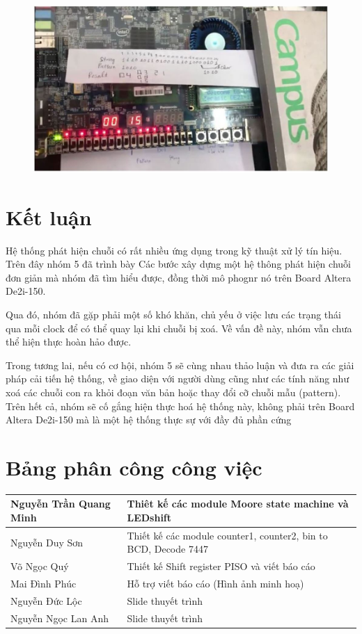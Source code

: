 \documentclass[a4paper]{article}
\begin{document}
	\begin{center}
	\begin{figure}[H]
		\begin{center}
			\includegraphics[scale=.5] {k7.jpg}
		\end{center}
	\end{figure}
	\end{center}  
\section{Kết luận}
	
Hệ thống phát hiện chuỗi có rất nhiều ứng dụng trong kỹ thuật xử lý tín hiệu. Trên đây nhóm 5 đã trình bày Các bước xây dựng một hệ thông phát hiện chuỗi đơn giản mà nhóm đã tìm hiểu được, đồng thời mô phognr nó trên Board Altera De2i-150.

Qua đó, nhóm đã gặp phải một số khó khăn, chủ yếu ở việc lưu các trạng thái qua mỗi clock để có thể quay lại khi chuỗi bị xoá. Về vấn đề này, nhóm vẫn chưa thể hiện thực hoàn hảo được.

Trong tương lai, nếu có cơ hội, nhóm 5 sẽ cùng nhau thảo luận và đưa ra các giải pháp cải tiến hệ thống, về giao diện với người dùng cũng như các tính năng như xoá các chuỗi con ra khỏi đoạn văn bản hoặc thay đổi cỡ chuỗi mẫu (pattern). Trên hết cả, nhóm sẽ cố gắng hiện thực hoá hệ thống này, không phải trên Board Altera De2i-150 mà là một hệ thống thực sự với đầy đủ phần cứng 


\section{Bảng phân công công việc}
\begin{tabular}{ |l|l|}
\hline
  Nguyễn Trần Quang Minh & Thiêt kế các module Moore state machine và LEDshift \\
  \hline
  Nguyễn Duy Sơn & Thiết kế các module counter1, counter2, bin to BCD, Decode 7447\\
\hline  
  Võ Ngọc Quý &  Thiết kế Shift register PISO và viết báo cáo\\
\hline  
  Mai Đình Phúc &  Hỗ trợ viết báo cáo (Hình ảnh minh hoạ)\\
\hline  
  Nguyễn Đức Lộc & Slide thuyết trình \\
\hline  
  Nguyễn Ngọc Lan Anh & Slide thuyết trình \\
  \hline
\end{tabular}
\end{document}
